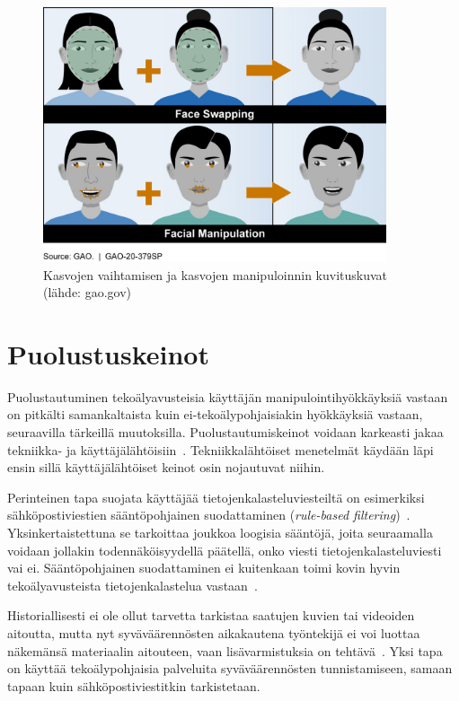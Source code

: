 \begin{otherlanguage}{finnish}
\begin{figure}[ht]  
    \centering  
    \includegraphics[width=0.9\textwidth]{images/704754.png}  
    \caption{Kasvojen vaihtamisen ja kasvojen manipuloinnin kuvituskuvat (lähde: gao.gov)}  
    \label{figure:deepfakes_fin}  
\end{figure}  


\section*{Puolustuskeinot}

Puolustautuminen tekoälyavusteisia käyttäjän manipulointihyökkäyksiä vastaan on pitkälti samankaltaista kuin ei-tekoälypohjaisiakin hyökkäyksiä vastaan, seuraavilla tärkeillä muutoksilla. Puolustautumiskeinot voidaan karkeasti jakaa tekniikka- ja käyttäjälähtöisiin~\citep{tsinganos_Towards_Automated_Recognition_Chat_SE_Enterprise_2018}. Tekniikkalähtöiset menetelmät käydään läpi ensin sillä käyttäjälähtöiset keinot osin nojautuvat niihin.

Perinteinen tapa suojata käyttäjää tietojenkalasteluviesteiltä on esimerkiksi sähköpostiviestien sääntöpohjainen suodattaminen (\textit{rule-based filtering})~\citep{mirsky_Threat_Offensive_AI_Organizations_2023}. Yksinkertaistettuna se tarkoittaa joukkoa loogisia sääntöjä, joita seuraamalla voidaan jollakin todennäköisyydellä päätellä, onko viesti tietojenkalasteluviesti vai ei. Sääntöpohjainen suodattaminen ei kuitenkaan toimi kovin hyvin tekoälyavusteista tietojenkalastelua vastaan~\citep{fakhouri_AI_Driven_Solutions_SE_Attacks_2024}.

Historiallisesti ei ole ollut tarvetta tarkistaa saatujen kuvien tai videoiden aitoutta, mutta nyt syväväärennösten aikakautena työntekijä ei voi luottaa näkemänsä materiaalin aitouteen, vaan lisävarmistuksia on tehtävä~\citep{mirsky_Creation_Detection_Deepfakes_2021}. Yksi tapa on käyttää tekoälypohjaisia palveluita syväväärennösten tunnistamiseen, samaan tapaan kuin sähköpostiviestitkin tarkistetaan.



\end{otherlanguage}
